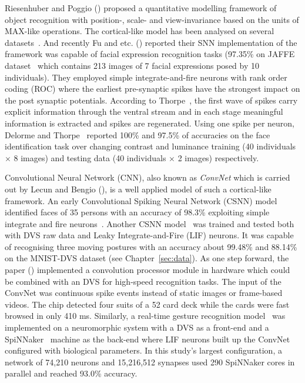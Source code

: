 Riesenhuber and Poggio (\cite{riesenhuber1999hierarchical}) proposed a quantitative modelling framework of object recognition with position-, scale- and view-invariance based on the units of MAX-like operations.
The cortical-like model has been analysed on several datasets~\cite{serre2007robust}.
And recently Fu and etc. (\cite{fu_spiking_2012}) reported their SNN implementation of the framework was capable of facial expression recognition tasks (97.35\% on JAFFE dataset~\cite{lyons1998coding} which contains 213 images of 7 facial expressions posed by 10 individuals).
They employed simple integrate-and-fire neurons with rank order coding (ROC) where  the earliest pre-synaptic spikes have the strongest impact on the post synaptic potentials.
According to Thorpe~\cite{vanrullen_surfing_2002}, the first wave of spikes  carry explicit information through the ventral stream and in each stage meaningful information is extracted and spikes are regenerated. 
Using one spike per neuron, Delorme and Thorpe~\cite{delorme_face_2001} reported 100\% and 97.5\% of accuracies on the face identification task over changing  contrast and luminance training (40 individuals $\times$ 8 images) and testing data  (40 individuals $\times$ 2 images) respectively.

Convolutional Neural Network (CNN), also known as \textit{ConvNet} which is carried out by Lecun and Bengio (\cite{lecun1995convolutional}), is a well applied model of such a cortical-like framework.
An early Convolutional Spiking Neural Network (CSNN) model identified faces of 35 persons with an accuracy of 98.3\% exploiting simple integrate and fire neurons~\cite{matsugu2002convolutional}.
Another CSNN model~\cite{zhao_feedforward_2014} was trained and tested both with DVS raw data and Leaky Integrate-and-Fire (LIF) neurons.
It was capable of recognising three moving postures with an accuracy about 99.48\% and 88.14\% on the MNIST-DVS dataset (see Chapter~\ref{sec:data}).
As one step forward, the paper (\cite{camunas2012event}) implemented a convolution processor module in hardware which could be combined with an DVS for high-speed recognition tasks.
The input of the ConvNet was continuous spike events instead of static images or frame-based videos. 
The chip detected four suits of a 52 card deck while the cards were fast browsed in only 410 ms.
Similarly, a real-time gesture recognition model~\cite{liu2014real} was implemented on a neuromorphic system with a DVS as a front-end and a SpiNNaker~\cite{furber2013overview} machine as the back-end where LIF neurons built up the ConvNet configured with biological parameters.
In this study's largest configuration, a network of 74,210 neurons and 15,216,512 synapses used 290 SpiNNaker cores in parallel and reached 93.0\% accuracy. 

